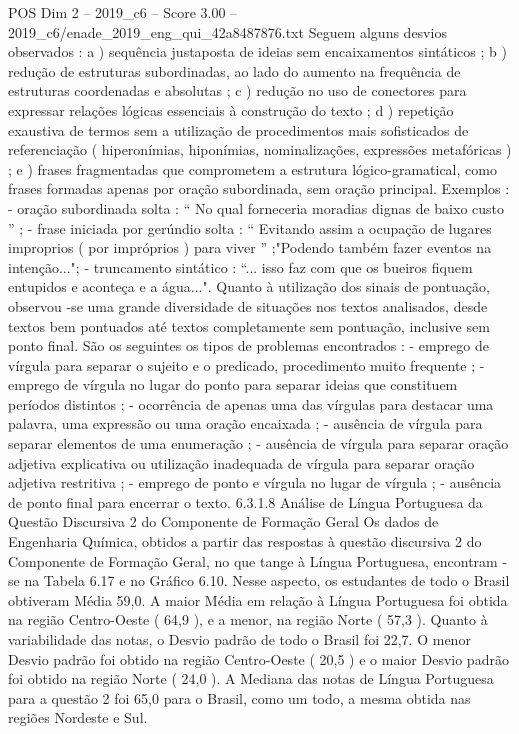 \begin{textsample}{POS Dim 2 – 2019\_c6 – Score 3.00 – 2019\_c6/enade\_2019\_eng\_qui\_42a8487876.txt}
Seguem alguns desvios observados : a ) sequência justaposta de ideias sem encaixamentos sintáticos ; b ) redução de estruturas subordinadas, ao lado do aumento na frequência de estruturas coordenadas e absolutas ; c ) redução no uso de conectores para expressar relações lógicas essenciais à construção do texto ; d ) repetição exaustiva de termos sem a utilização de procedimentos mais sofisticados de referenciação ( hiperonímias, hiponímias, nominalizações, expressões metafóricas ) ; e ) frases fragmentadas que comprometem a estrutura lógico-gramatical, como frases formadas apenas por oração subordinada, sem oração principal.
Exemplos : - oração subordinada solta : “ No qual forneceria moradias dignas de baixo custo ” ; - frase iniciada por gerúndio solta : “ Evitando assim a ocupação de lugares improprios ( por impróprios ) para viver ” ;"Podendo também fazer eventos na intenção..."; - truncamento sintático : “... isso faz com que os bueiros fiquem entupidos e aconteça e a água...".
Quanto à utilização dos sinais de pontuação, observou -se uma grande diversidade de situações nos textos analisados, desde textos bem pontuados até textos completamente sem pontuação, inclusive sem ponto final.
São os seguintes os tipos de problemas encontrados : - emprego de vírgula para separar o sujeito e o predicado, procedimento muito frequente ; - emprego de vírgula no lugar do ponto para separar ideias que constituem períodos distintos ; - ocorrência de apenas uma das vírgulas para destacar uma palavra, uma expressão ou uma oração encaixada ; - ausência de vírgula para separar elementos de uma enumeração ; - ausência de vírgula para separar oração adjetiva explicativa ou utilização inadequada de vírgula para separar oração adjetiva restritiva ; - emprego de ponto e vírgula no lugar de vírgula ; - ausência de ponto final para encerrar o texto. 6.3.1.8 Análise de Língua Portuguesa da Questão Discursiva 2 do Componente de Formação Geral Os dados de Engenharia Química, obtidos a partir das respostas à questão discursiva 2 do Componente de Formação Geral, no que tange à Língua Portuguesa, encontram -se na Tabela 6.17 e no Gráfico 6.10.
Nesse aspecto, os estudantes de todo o Brasil obtiveram Média 59,0.
A maior Média em relação à Língua Portuguesa foi obtida na região Centro-Oeste ( 64,9 ), e a menor, na região Norte ( 57,3 ).
Quanto à variabilidade das notas, o Desvio padrão de todo o Brasil foi 22,7.
O menor Desvio padrão foi obtido na região Centro-Oeste ( 20,5 ) e o maior Desvio padrão foi obtido na região Norte ( 24,0 ).
A Mediana das notas de Língua Portuguesa para a questão 2 foi 65,0 para o Brasil, como um todo, a mesma obtida nas regiões Nordeste e Sul.

\end{textsample}
